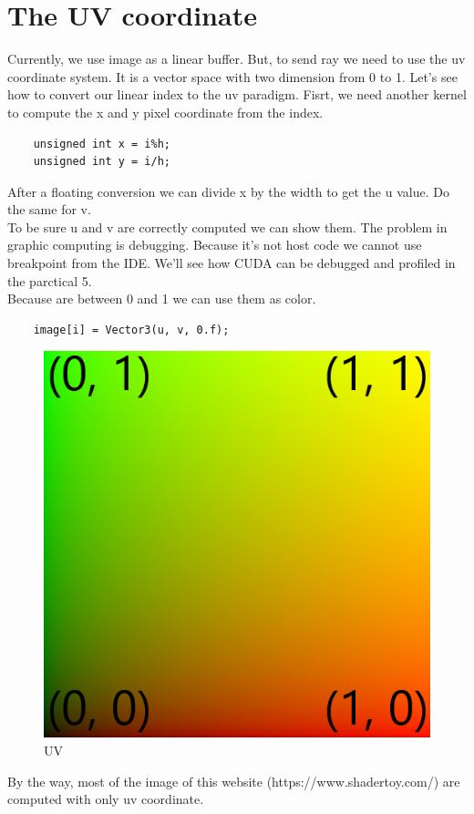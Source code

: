 \documentclass{article}
\begin{document}
\section{The UV coordinate}
Currently, we use image as a linear buffer. But, to send ray we need to use the uv coordinate system. It is a vector space with two dimension from 0 to 1. Let's see how to convert our linear index to the uv paradigm. Fisrt, we need another kernel to compute the x and y pixel coordinate from the index. 
\begin{lstlisting}
	unsigned int x = i%h;
	unsigned int y = i/h;
\end{lstlisting}
After a floating conversion we can divide x by the width to get the u value. Do the same for v.\\
To be sure u and v are correctly computed we can show them. The problem in graphic computing is debugging. Because it's not host code we cannot use breakpoint from the IDE. We'll see how CUDA can be debugged and profiled in the parctical 5.\\
Because are between 0 and 1 we can use them as color. 
\begin{lstlisting}
	image[i] = Vector3(u, v, 0.f);
\end{lstlisting}
\begin{figure}[h]
	\centering
	\includegraphics[scale=0.2]{figures/uv.png}
	\caption{UV}
\end{figure}
By the way, most of the image of this website (https://www.shadertoy.com/) are computed with only uv coordinate.
\end{document}
